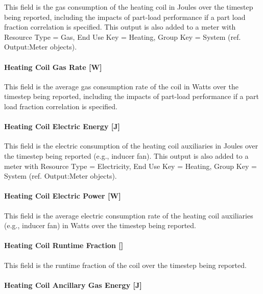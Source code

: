 This field is the gas consumption of the heating coil in Joules over the timestep being reported, including the impacts of part-load performance if a part load fraction correlation is specified. This output is also added to a meter with Resource Type = Gas, End Use Key = Heating, Group Key = System (ref. Output:Meter objects).

\paragraph{Heating Coil Gas Rate {[}W{]}}\label{heating-coil-gas-rate-w}

This field is the average gas consumption rate of the coil in Watts over the timestep being reported, including the impacts of part-load performance if a part load fraction correlation is specified.

\paragraph{Heating Coil Electric Energy {[}J{]}}\label{heating-coil-electric-energy-j-2}

This field is the electric consumption of the heating coil auxiliaries in Joules over the timestep being reported (e.g., inducer fan). This output is also added to a meter with Resource Type = Electricity, End Use Key = Heating, Group Key = System (ref. Output:Meter objects).

\paragraph{Heating Coil Electric Power {[}W{]}}\label{heating-coil-electric-power-w-3}

This field is the average electric consumption rate of the heating coil auxiliaries (e.g., inducer fan) in Watts over the timestep being reported.

\paragraph{\texorpdfstring{Heating Coil Runtime Fraction {[]}}{Heating Coil Runtime Fraction }}\label{heating-coil-runtime-fraction-3}

This field is the runtime fraction of the coil over the timestep being reported.

\paragraph{Heating Coil Ancillary Gas Energy {[}J{]}}\label{heating-coil-ancillary-gas-energy-j}

